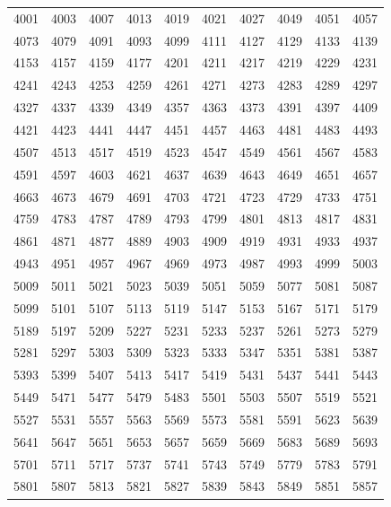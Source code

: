 \documentclass{article}
\begin{document}
\begin{tabular}{rrrrrrrrrr}
4001 & 4003 & 4007 & 4013 & 4019 & 4021 & 4027 & 4049 & 4051 & 4057 \\
4073 & 4079 & 4091 & 4093 & 4099 & 4111 & 4127 & 4129 & 4133 & 4139 \\
4153 & 4157 & 4159 & 4177 & 4201 & 4211 & 4217 & 4219 & 4229 & 4231 \\
4241 & 4243 & 4253 & 4259 & 4261 & 4271 & 4273 & 4283 & 4289 & 4297 \\
4327 & 4337 & 4339 & 4349 & 4357 & 4363 & 4373 & 4391 & 4397 & 4409 \\
4421 & 4423 & 4441 & 4447 & 4451 & 4457 & 4463 & 4481 & 4483 & 4493 \\
4507 & 4513 & 4517 & 4519 & 4523 & 4547 & 4549 & 4561 & 4567 & 4583 \\
4591 & 4597 & 4603 & 4621 & 4637 & 4639 & 4643 & 4649 & 4651 & 4657 \\
4663 & 4673 & 4679 & 4691 & 4703 & 4721 & 4723 & 4729 & 4733 & 4751 \\
4759 & 4783 & 4787 & 4789 & 4793 & 4799 & 4801 & 4813 & 4817 & 4831 \\
4861 & 4871 & 4877 & 4889 & 4903 & 4909 & 4919 & 4931 & 4933 & 4937 \\
4943 & 4951 & 4957 & 4967 & 4969 & 4973 & 4987 & 4993 & 4999 & 5003 \\
5009 & 5011 & 5021 & 5023 & 5039 & 5051 & 5059 & 5077 & 5081 & 5087 \\
5099 & 5101 & 5107 & 5113 & 5119 & 5147 & 5153 & 5167 & 5171 & 5179 \\
5189 & 5197 & 5209 & 5227 & 5231 & 5233 & 5237 & 5261 & 5273 & 5279 \\
5281 & 5297 & 5303 & 5309 & 5323 & 5333 & 5347 & 5351 & 5381 & 5387 \\
5393 & 5399 & 5407 & 5413 & 5417 & 5419 & 5431 & 5437 & 5441 & 5443 \\
5449 & 5471 & 5477 & 5479 & 5483 & 5501 & 5503 & 5507 & 5519 & 5521 \\
5527 & 5531 & 5557 & 5563 & 5569 & 5573 & 5581 & 5591 & 5623 & 5639 \\
5641 & 5647 & 5651 & 5653 & 5657 & 5659 & 5669 & 5683 & 5689 & 5693 \\
5701 & 5711 & 5717 & 5737 & 5741 & 5743 & 5749 & 5779 & 5783 & 5791 \\
5801 & 5807 & 5813 & 5821 & 5827 & 5839 & 5843 & 5849 & 5851 & 5857 \\
\end{tabular}
\end{document}
